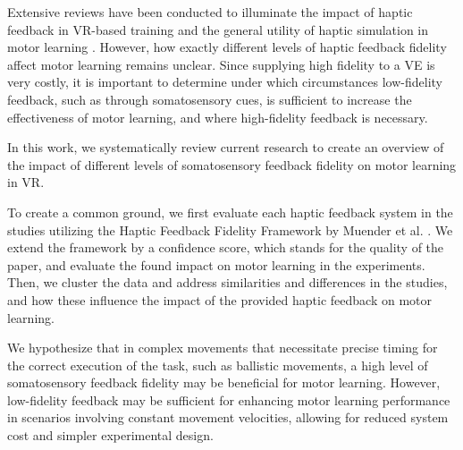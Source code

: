 Extensive reviews have been conducted to illuminate the impact of haptic feedback in VR-based training \cite{Sigrist2013AugmentedReview} and the general utility of haptic simulation in motor learning \cite{Al-Saud2021TheReview}. However, how exactly different levels of haptic feedback fidelity affect motor learning remains unclear.
Since supplying high fidelity to a VE is very costly, it is important to determine under which circumstances low-fidelity feedback, such as through somatosensory cues, is sufficient to increase the effectiveness of motor learning, and where high-fidelity feedback is necessary. 

In this work, we systematically review current research to create an overview of the impact of different levels of somatosensory feedback fidelity on motor learning in VR. 

To create a common ground, we first evaluate each haptic feedback system in the studies utilizing the Haptic Feedback Fidelity Framework by Muender et al. \cite{Muender2022HapticReality}. We extend the framework by a confidence score, which stands for the quality of the paper, and evaluate the found impact on motor learning in the experiments. Then, we cluster the data and address similarities and differences in the studies, and how these influence the impact of the provided haptic feedback on motor learning. 

We hypothesize that in complex movements that necessitate precise timing for the correct execution of the task, such as ballistic movements, a high level of somatosensory feedback fidelity may be beneficial for motor learning. However, low-fidelity feedback may be sufficient for enhancing motor learning performance in scenarios involving constant movement velocities, allowing for reduced system cost and simpler experimental design. 

